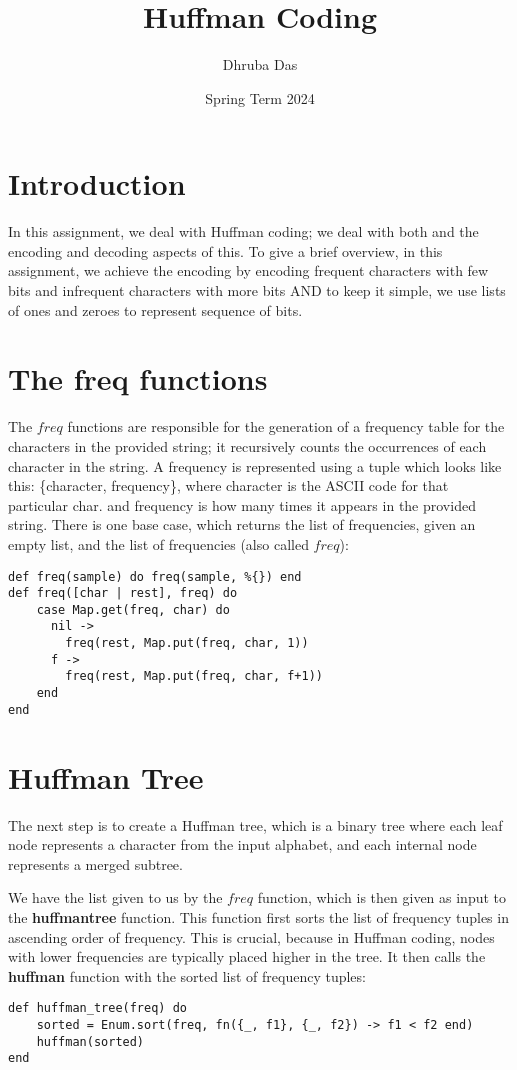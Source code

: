 \documentclass[a4paper,11pt]{article}
\begin{document}
\title{
    \textbf{Huffman Coding}
}
\author{Dhruba Das}
\date{Spring Term 2024}

\maketitle

\section*{Introduction}
In this assignment, we deal with Huffman coding; we deal with both and the encoding and decoding aspects of this. To give a brief overview, in this assignment, we achieve the encoding by encoding frequent characters with few bits and infrequent characters with more bits AND to keep it simple, we use lists of ones and zeroes to represent sequence of bits.


\section*{The freq functions}
The $freq$ functions are responsible for the generation of a frequency table for the characters in the provided string; it recursively counts the occurrences of each character in the string. A frequency is represented using a tuple which looks like this: \{character, frequency\},  where character is the ASCII code for that particular char. and frequency is how many times it appears in the provided string. There is one base case, which returns the list of frequencies, given an empty list, and the list of frequencies (also called $freq$):
\begin{verbatim}
def freq(sample) do freq(sample, %{}) end
def freq([char | rest], freq) do
    case Map.get(freq, char) do
      nil ->
        freq(rest, Map.put(freq, char, 1))
      f ->
        freq(rest, Map.put(freq, char, f+1))
    end
end
\end{verbatim}


\section*{Huffman Tree}
The next step is to create a Huffman tree, which is a binary tree where each leaf node represents a character from the input alphabet, and each internal node represents a merged subtree.

We have the list given to us by the $freq$ function, which is then given as input to the \textbf{huffmantree} function. This function first sorts the list of frequency tuples in ascending order of frequency. This is crucial, because in Huffman coding, nodes with lower frequencies are typically placed higher in the tree. It then calls the \textbf{huffman} function with the sorted list of frequency tuples:
\begin{verbatim}
def huffman_tree(freq) do
    sorted = Enum.sort(freq, fn({_, f1}, {_, f2}) -> f1 < f2 end)
    huffman(sorted)
end
\end{verbatim}
\end{document}
